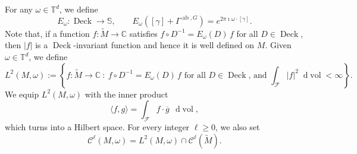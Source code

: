 \documentclass[11pt,letterpaper]{amsart}
\newcommand \cF {{\mathcal F}}
\def\C{{\mathbb C}}
\newcommand \T {{ \mathbb T}}
\newcommand \tM {{\widetilde M}}
\newcommand*{\diff}{\mathop{}\!\mathrm{d}}
\DeclareMathOperator{\vol}{vol}
\DeclareMathOperator{\Deck}{Deck}
\DeclareMathOperator{\abel}{ab}
\theoremstyle{definition}
\begin{document}
For any $\omega \in \T^d$, we define
\[
E_\omega \colon \Deck \to \mathbb{S}, \qquad E_\omega([\gamma] + \Gamma^{\abel, G}) = e^{2 \pi \imath \omega \cdot [\gamma]}.
\]
Note that, if a function $f \colon \tM \to \C$ satisfies $f \circ D^{-1} = E_\omega(D) \, f$ for all $D \in \Deck$, then $|f|$ is a $\Deck$-invariant function and hence it is well defined on $M$. 
Given $\omega \in \T^d$, we define
\[
L^2(M,\omega) := \left\{ f \colon \tM \to \C \ : \ f \circ D^{-1} = E_\omega(D) \, f \text{\ for all $D \in \Deck$, and\ } \int_{\cF} |f|^2 \diff \vol < \infty \right\}. 
\]
We equip $L^2(M,\omega)$ with the inner product 
\[
\langle f,g\rangle = \int_{\cF} f \cdot \overline{g} \, \diff \vol,
\]
which turns into a Hilbert space.
For every integer $\ell \geq 0$, we also set
\[
\mathscr{C}^\ell(M,\omega) = L^2(M,\omega) \cap \mathscr{C}^\ell(\tM).
\]
\end{document}
